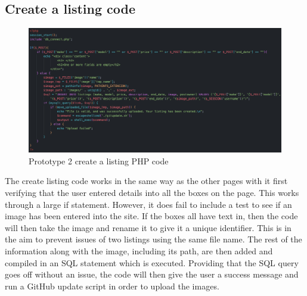 \subsection{Create a listing code}
\begin{figure}[H]
    \centering
    \includegraphics[scale=0.4]{ch3_developing/proto2/proto2_cameralisting.png}
    \caption{Prototype 2 create a listing PHP code}
    \label{fig:proto2_cameralisting}
\end{figure}
The create listing code works in the same way as the other pages with it first verifying that the user entered details into all the boxes on the page. This works through a large if statement. However, it does fail to include a test to see if an image has been entered into the site. If the boxes all have text in, then the code will then take the image and rename it to give it a unique identifier. This is in the aim to prevent issues of two listings using the same file name. The rest of the information along with the image, including its path, are then added and compiled in an SQL statement which is executed.  Providing that the SQL query goes off without an issue, the code will then give the user a success message and run a GitHub update script in order to upload the images. 

